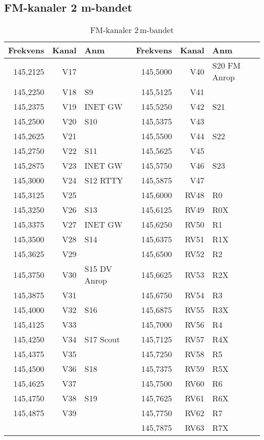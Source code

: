 {\clearpage
\subsection{FM-kanaler 2 m-bandet}

\begin{longtable}{rrl|rrl}
\caption{FM-kanaler 2\,m-bandet}\\
\textbf{Frekvens} & \textbf{Kanal} & \textbf{Anm} &
\textbf{Frekvens} & \textbf{Kanal} & \textbf{Anm} \\ \hline

145,2125 & V17 &              & 145,5000 & V40  & S20  FM Anrop \\
145,2250 & V18 & S9           & 145,5125 & V41  &               \\
145,2375 & V19 & INET GW      & 145,5250 & V42  & S21           \\
145,2500 & V20 & S10          & 145,5375 & V43  &               \\
145,2625 & V21 &              & 145,5500 & V44  & S22           \\
145,2750 & V22 & S11          & 145,5625 & V45  &               \\
145,2875 & V23 & INET GW      & 145,5750 & V46  & S23           \\
145,3000 & V24 & S12  RTTY    & 145,5875 & V47  &               \\
145,3125 & V25 &              & 145,6000 & RV48 & R0            \\
145,3250 & V26 & S13          & 145,6125 & RV49 & R0X           \\
145,3375 & V27 & INET GW      & 145,6250 & RV50 & R1            \\
145,3500 & V28 & S14          & 145,6375 & RV51 & R1X           \\
145,3625 & V29 &              & 145,6500 & RV52 & R2            \\
145,3750 & V30 & S15 DV Anrop & 145,6625 & RV53 & R2X           \\
145,3875 & V31 &              & 145,6750 & RV54 & R3            \\
145,4000 & V32 & S16          & 145,6875 & RV55 & R3X           \\
145,4125 & V33 &              & 145,7000 & RV56 & R4            \\
145,4250 & V34 & S17 Scout    & 145,7125 & RV57 & R4X           \\
145,4375 & V35 &              & 145,7250 & RV58 & R5            \\
145,4500 & V36 & S18          & 145,7375 & RV59 & R5X           \\
145,4625 & V37 &              & 145,7500 & RV60 & R6            \\
145,4750 & V38 & S19          & 145,7625 & RV61 & R6X           \\
145,4875 & V39 &              & 145,7750 & RV62 & R7            \\
         &     &              & 145,7875 & RV63 & R7X
\end{longtable}

}
